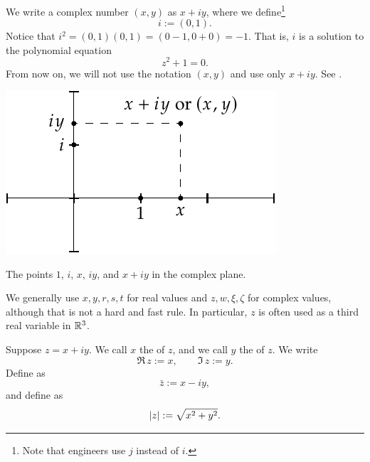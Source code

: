 We write a complex number $(x,y)$ as $x+iy$, where we
define\footnote{Note that engineers use $j$ instead of $i$.}
\begin{equation*}
i := (0,1) .
\end{equation*}
Notice that $i^2 = (0,1)(0,1) = (0-1,0+0) = -1$.
That is, $i$ is a solution to the polynomial equation
\begin{equation*}
z^2+1=0 .
\end{equation*}
From now on, we will not use the notation $(x,y)$ and use only $x+iy$.
See .
\begin{myfigureht}
\includegraphics{figures/complexplane}
\caption{The points $1$, $i$, $x$, $iy$, and $x+iy$ in the complex
plane.\label{fig:complexplane}}
\end{myfigureht}

We generally use $x,y,r,s,t$ for real values and $z,w,\xi,\zeta$
for complex values, although that is not a hard and fast rule.  In
particular, $z$ is often used as a third real variable in ${\mathbb{R}}^3$.

\begin{defn}
Suppose $z= x+iy$.
We call $x$ 
the \emph{} of $z$, and 
we call $y$
the \emph{} of $z$.  We write
\begin{equation*}
\Re\, z := x , \qquad
\Im\, z := y .
\end{equation*}
Define 
\emph{} as
\begin{equation*}
\bar{z} := x-iy ,
\end{equation*}
and define \emph{} as
\begin{equation*}
\lvert {z} \rvert := \sqrt{x^2+y^2} .
\end{equation*}
\end{defn}

